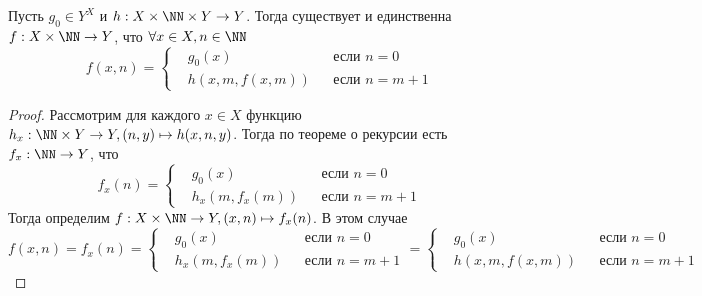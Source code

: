 \documentclass[12pt,a4paper]{article}
\begin{document}
    \begin{theorem}
        Пусть $g_0 \in Y^X$ и $h: X \times \NN \times Y \to Y$. Тогда существует и единственна $f: X \times \NN \to Y$, что $\forall x \in X, n \in \NN$
        \[f(x, n) = \left\{\begin{aligned}
            &g_0(x)&&\text{если }n=0\\
            &h(x, m ,f(x, m))&&\text{если }n=m+1
        \end{aligned}\right.\]
    \end{theorem}

    \begin{proof}
        Рассмотрим для каждого $x \in X$ функцию $h_x: \NN \times Y \to Y, (n, y) \mapsto h(x, n, y)$. Тогда по теореме о рекурсии есть $f_x: \NN \to Y$, что
        \[f_x(n) = \left\{\begin{aligned}
            &g_0(x)&&\text{если $n=0$}\\
            &h_x(m, f_x(m))&&\text{если $n=m+1$}
        \end{aligned}\right.\]
        Тогда определим $f: X \times \NN \to Y, (x, n) \mapsto f_x(n)$. В этом случае
        \[f(x, n) = f_x(n) = \left\{\begin{aligned}
            &g_0(x)&&\text{если $n=0$}\\
            &h_x(m, f_x(m))&&\text{если $n=m+1$}
        \end{aligned}\right.=\left\{\begin{aligned}
            &g_0(x)&&\text{если $n=0$}\\
            &h(x, m, f(x, m))&&\text{если $n=m+1$}
        \end{aligned}\right.\]
    \end{proof}
\end{document}
